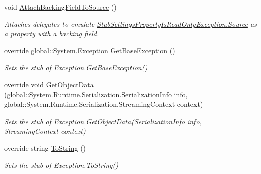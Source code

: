 \begin{DoxyCompactItemize}
void \hyperlink{class_system_1_1_configuration_1_1_fakes_1_1_stub_settings_property_is_read_only_exception_aa5e59cca8b2c649b3490f0ef78caa46a}{Attach\-Backing\-Field\-To\-Source} ()
\begin{DoxyCompactList}\small\item\em Attaches delegates to emulate \hyperlink{class_system_1_1_configuration_1_1_fakes_1_1_stub_settings_property_is_read_only_exception_abf075821e211dd3cb217412f07464a6a}{Stub\-Settings\-Property\-Is\-Read\-Only\-Exception.\-Source} as a property with a backing field.\end{DoxyCompactList}\item 
override global\-::\-System.\-Exception \hyperlink{class_system_1_1_configuration_1_1_fakes_1_1_stub_settings_property_is_read_only_exception_ab93ae581f43bbf1ec968edc69a358628}{Get\-Base\-Exception} ()
\begin{DoxyCompactList}\small\item\em Sets the stub of Exception.\-Get\-Base\-Exception()\end{DoxyCompactList}\item 
override void \hyperlink{class_system_1_1_configuration_1_1_fakes_1_1_stub_settings_property_is_read_only_exception_a06b43dd5acdcea2b0c5207020416361b}{Get\-Object\-Data} (global\-::\-System.\-Runtime.\-Serialization.\-Serialization\-Info info, global\-::\-System.\-Runtime.\-Serialization.\-Streaming\-Context context)
\begin{DoxyCompactList}\small\item\em Sets the stub of Exception.\-Get\-Object\-Data(\-Serialization\-Info info, Streaming\-Context context)\end{DoxyCompactList}\item 
override string \hyperlink{class_system_1_1_configuration_1_1_fakes_1_1_stub_settings_property_is_read_only_exception_a3e4a077f6433a1d101a1eef769d0ebad}{To\-String} ()
\begin{DoxyCompactList}\small\item\em Sets the stub of Exception.\-To\-String()\end{DoxyCompactList}\end{DoxyCompactItemize}
